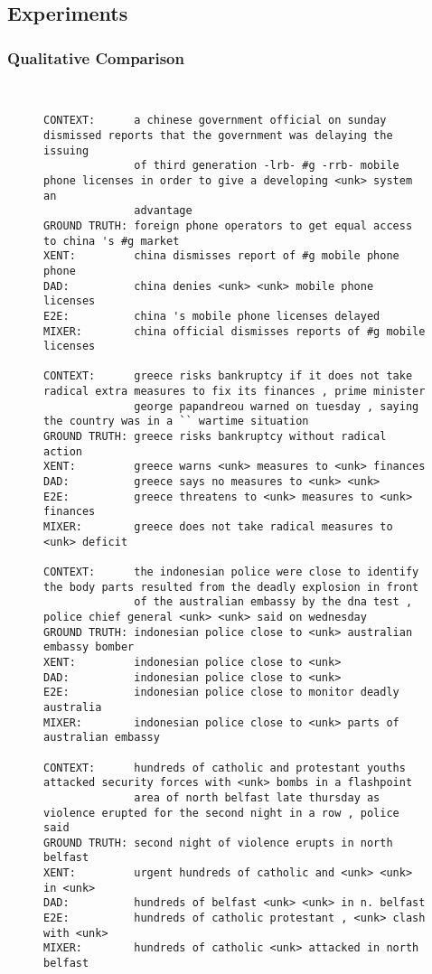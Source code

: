 \documentclass{article} \usepackage{iclr2016_conference,times}
\begin{document}
\subsection{Experiments}


\subsubsection{Qualitative Comparison}
\begin{figure}[h!]
\tiny{
\begin{verbatim}


CONTEXT:      a chinese government official on sunday dismissed reports that the government was delaying the issuing
              of third generation -lrb- #g -rrb- mobile phone licenses in order to give a developing <unk> system an
              advantage
GROUND TRUTH: foreign phone operators to get equal access to china 's #g market
XENT:         china dismisses report of #g mobile phone phone
DAD:          china denies <unk> <unk> mobile phone licenses
E2E:          china 's mobile phone licenses delayed
MIXER:        china official dismisses reports of #g mobile licenses

CONTEXT:      greece risks bankruptcy if it does not take radical extra measures to fix its finances , prime minister
              george papandreou warned on tuesday , saying the country was in a `` wartime situation
GROUND TRUTH: greece risks bankruptcy without radical action
XENT:         greece warns <unk> measures to <unk> finances
DAD:          greece says no measures to <unk> <unk>
E2E:          greece threatens to <unk> measures to <unk> finances
MIXER:        greece does not take radical measures to <unk> deficit

CONTEXT:      the indonesian police were close to identify the body parts resulted from the deadly explosion in front
              of the australian embassy by the dna test , police chief general <unk> <unk> said on wednesday
GROUND TRUTH: indonesian police close to <unk> australian embassy bomber
XENT:         indonesian police close to <unk>
DAD:          indonesian police close to <unk>
E2E:          indonesian police close to monitor deadly australia
MIXER:        indonesian police close to <unk> parts of australian embassy

CONTEXT:      hundreds of catholic and protestant youths attacked security forces with <unk> bombs in a flashpoint
              area of north belfast late thursday as violence erupted for the second night in a row , police said
GROUND TRUTH: second night of violence erupts in north belfast
XENT:         urgent hundreds of catholic and <unk> <unk> in <unk>
DAD:          hundreds of belfast <unk> <unk> in n. belfast
E2E:          hundreds of catholic protestant , <unk> clash with <unk>
MIXER:        hundreds of catholic <unk> attacked in north belfast


\end{verbatim}}
\end{figure}
\end{document}

